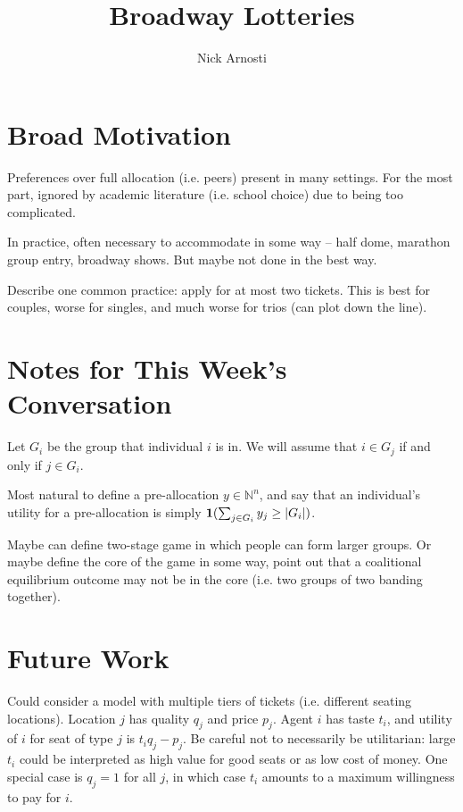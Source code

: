 \documentclass[11pt, oneside]{article}   	%
\title{Broadway Lotteries}
\author{Nick Arnosti}
\date{}							%
\begin{document}
\maketitle

\onehalfspacing

\section{Broad Motivation}

Preferences over full allocation (i.e. peers) present in many settings. For the most part, ignored by academic literature (i.e. school choice) due to being too complicated.

In practice, often necessary to accommodate in some way -- half dome, marathon group entry, broadway shows. But maybe not done in the best way.

Describe one common practice: apply for at most two tickets. This is best for couples, worse for singles, and much worse for trios (can plot down the line). 


\section{Notes for This Week's Conversation}

Let $G_i$ be the group that individual $i$ is in. We will assume that $i \in G_j$ if and only if $j \in G_i$.

Most natural to define a pre-allocation $y \in \mathbb{N}^n$, and say that an individual's utility for a pre-allocation is simply ${\bf 1}(\sum_{j \in G_i} y_j \geq |G_i|)$.

Maybe can define two-stage game in which people can form larger groups. Or maybe define the core of the game in some way, point out that a coalitional equilibrium outcome may not be in the core (i.e. two groups of two banding together).

\section{Future Work}

Could consider a model with multiple tiers of tickets (i.e. different seating locations). Location $j$ has quality $q_j$ and price $p_j$. Agent $i$ has taste $t_i$, and utility of $i$ for seat of type $j$ is $t_i q_j - p_j$. {\color{blue} Be careful not to necessarily be utilitarian: large $t_i$ could be interpreted as high value for good seats or as low cost of money.} One special case is $q_j = 1$ for all $j$, in which case $t_i$ amounts to a maximum willingness to pay for $i$. 
\end{document}
